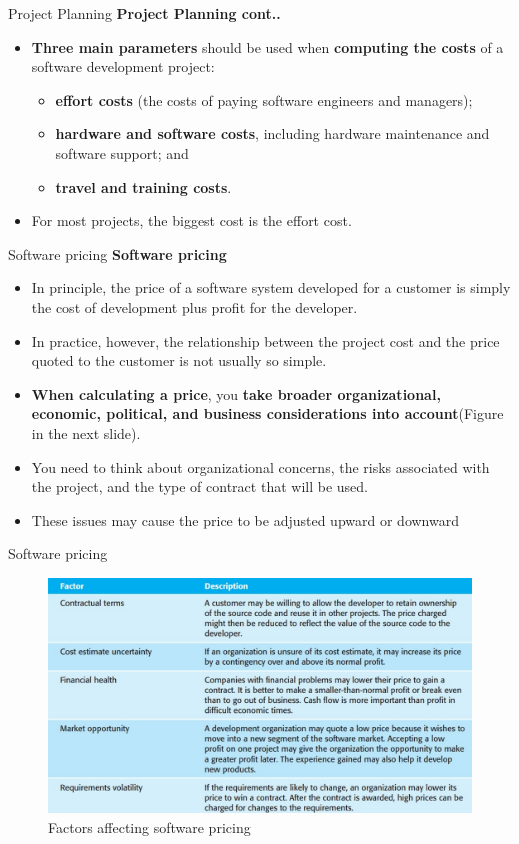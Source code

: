 \documentclass{beamer}
\begin{document}
\begin{frame}{Project Planning}
	\textbf{Project Planning cont..}
	\begin{itemize}
		\item \textbf{Three main parameters} should be used when \textbf{computing the costs }of a software development project: 
		\begin{itemize}
			\item \textbf{effort costs} (the costs of paying software engineers and managers); 
			\item \textbf{hardware and software costs}, including hardware maintenance and software support; and 
			\item \textbf{travel and training costs}. 
		\end{itemize}
	\item For most projects, the biggest cost is the effort cost. 
	\end{itemize}
\end{frame}
\begin{frame}{Software pricing}
	\textbf{Software pricing}
	\begin{itemize}
		\item In principle, the price of a software system developed for a customer is simply the cost of development plus profit for the developer.
		\item In practice, however, the relationship between the project cost and the price quoted to the customer is not usually so simple.
		\item\textbf{ When calculating a price}, you \textbf{take broader organizational, economic, political, and business considerations into account}(Figure in the next slide).
		\item You need to think about organizational concerns, the risks associated with the project, and the type of contract that will be used.
		\item These issues may cause the price to be adjusted upward or downward
		
	\end{itemize}
\end{frame}
\begin{frame}{Software pricing}
	\begin{figure}
	\includegraphics[scale=.5]{img/m4_4}
	\caption{Factors 
		affecting software 
		pricing
	}
\end{figure}
\end{frame}
\end{document}

